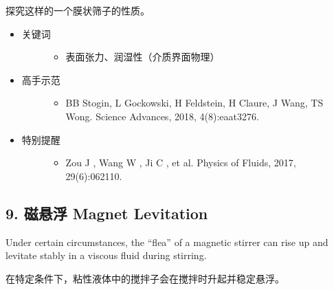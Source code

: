 \documentclass[a4paper,10pt,english]{sphinxmanual}
\begin{document}
探究这样的一个膜状筛子的性质。
\begin{itemize}
\item {} \begin{description}
\item[{关键词}] \leavevmode\begin{itemize}
\item {} 
表面张力、润湿性（介质界面物理）

\end{itemize}

\end{description}

\item {} \begin{description}
\item[{高手示范}] \leavevmode\begin{itemize}
\item {} 
BB Stogin, L Gockowski, H Feldstein, H Claure, J Wang, TS Wong.  Science Advances, 2018, 4(8):eaat3276.

\end{itemize}

\end{description}

\item {} \begin{description}
\item[{特别提醒}] \leavevmode\begin{itemize}
\item {} 
Zou J , Wang W , Ji C , et al.  Physics of Fluids, 2017, 29(6):062110.

\end{itemize}

\end{description}

\end{itemize}


\subsection{9. 磁悬浮 Magnet Levitation}
\label{\detokenize{7. Appendix:magnet-levitation}}
Under certain circumstances, the “flea” of a magnetic stirrer can rise up and levitate stably in a viscous fluid during stirring.

在特定条件下，粘性液体中的搅拌子会在搅拌时升起并稳定悬浮。
\end{document}
